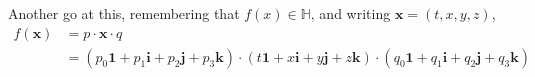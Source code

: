 \documentclass{amsart}
\providecommand{\HH}{\mathbb{H}}
\newcommand{\1}{\boldsymbol{1}}
\renewcommand{\i}{\boldsymbol{i}}
\renewcommand{\j}{\boldsymbol{j}}
\renewcommand{\k}{\boldsymbol{k}}
\begin{document}
Another go at this, remembering that $f(x) \in \HH$, and writing $\boldsymbol{x} = (t, x, y, z)$,
\begin{align*}
  f(\boldsymbol{x}) &= p \cdot \boldsymbol{x} \cdot q \\
  &= (p_0\1 + p_1\i + p_2\j + p_3\k)\cdot(t\1 + x\i + y\j + z\k)\cdot(q_0\1 + q_1\i + q_2\j + q_3\k) \\
  
\end{align*}
\end{document}
